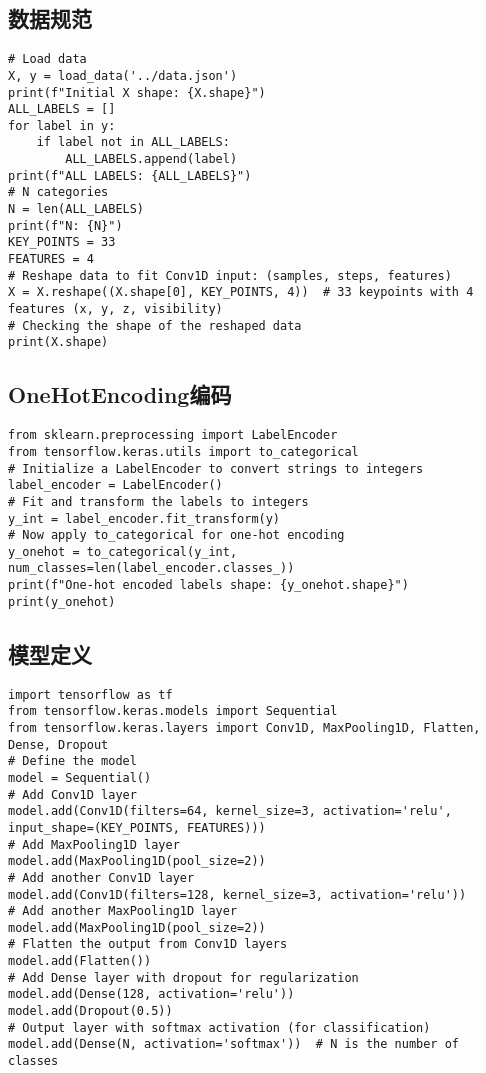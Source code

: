 \subsection{数据规范}

\begin{lstlisting}
# Load data
X, y = load_data('../data.json')
print(f"Initial X shape: {X.shape}")
ALL_LABELS = []
for label in y:
    if label not in ALL_LABELS:
        ALL_LABELS.append(label)
print(f"ALL LABELS: {ALL_LABELS}")
# N categories
N = len(ALL_LABELS)
print(f"N: {N}")
KEY_POINTS = 33
FEATURES = 4
# Reshape data to fit Conv1D input: (samples, steps, features)
X = X.reshape((X.shape[0], KEY_POINTS, 4))  # 33 keypoints with 4 features (x, y, z, visibility)
# Checking the shape of the reshaped data
print(X.shape)
\end{lstlisting}

\subsection{OneHotEncoding编码}

\begin{lstlisting}
from sklearn.preprocessing import LabelEncoder
from tensorflow.keras.utils import to_categorical
# Initialize a LabelEncoder to convert strings to integers
label_encoder = LabelEncoder()
# Fit and transform the labels to integers
y_int = label_encoder.fit_transform(y)
# Now apply to_categorical for one-hot encoding
y_onehot = to_categorical(y_int, num_classes=len(label_encoder.classes_))
print(f"One-hot encoded labels shape: {y_onehot.shape}")
print(y_onehot)
\end{lstlisting}

\subsection{模型定义}

\begin{lstlisting}
import tensorflow as tf
from tensorflow.keras.models import Sequential
from tensorflow.keras.layers import Conv1D, MaxPooling1D, Flatten, Dense, Dropout
# Define the model
model = Sequential()
# Add Conv1D layer
model.add(Conv1D(filters=64, kernel_size=3, activation='relu', input_shape=(KEY_POINTS, FEATURES)))
# Add MaxPooling1D layer
model.add(MaxPooling1D(pool_size=2))
# Add another Conv1D layer
model.add(Conv1D(filters=128, kernel_size=3, activation='relu'))
# Add another MaxPooling1D layer
model.add(MaxPooling1D(pool_size=2))
# Flatten the output from Conv1D layers
model.add(Flatten())
# Add Dense layer with dropout for regularization
model.add(Dense(128, activation='relu'))
model.add(Dropout(0.5))
# Output layer with softmax activation (for classification)
model.add(Dense(N, activation='softmax'))  # N is the number of classes
\end{lstlisting}

